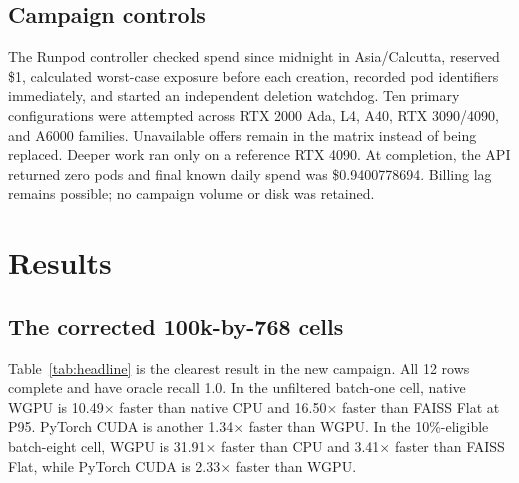 \documentclass[10pt]{article}
\begin{document}
\subsection{Campaign controls}
The Runpod controller checked spend since midnight in Asia/Calcutta, reserved \$1, calculated worst-case exposure before each creation, recorded pod identifiers immediately, and started an independent deletion watchdog. Ten primary configurations were attempted across RTX 2000 Ada, L4, A40, RTX 3090/4090, and A6000 families. Unavailable offers remain in the matrix instead of being replaced. Deeper work ran only on a reference RTX 4090. At completion, the API returned zero pods and final known daily spend was \$0.9400778694. Billing lag remains possible; no campaign volume or disk was retained.

\section{Results}
\subsection{The corrected 100k-by-768 cells}
Table~\ref{tab:headline} is the clearest result in the new campaign. All 12 rows complete and have oracle recall 1.0. In the unfiltered batch-one cell, native WGPU is 10.49$\times$ faster than native CPU and 16.50$\times$ faster than FAISS Flat at P95. PyTorch CUDA is another 1.34$\times$ faster than WGPU. In the 10\%-eligible batch-eight cell, WGPU is 31.91$\times$ faster than CPU and 3.41$\times$ faster than FAISS Flat, while PyTorch CUDA is 2.33$\times$ faster than WGPU.
\end{document}
